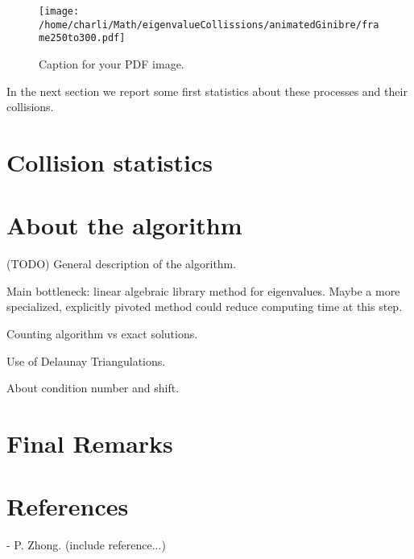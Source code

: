 \documentclass{article}
\begin{document}
\newpage


\begin{figure}[htbp]
    \centering
    \texttt{[image: /home/charli/Math/eigenvalueCollissions/animatedGinibre/frame250to300.pdf]}
    \caption{Caption for your PDF image.}
    \label{fig:pdf_image}
\end{figure}

	In the next section we report some first statistics about these processes and their collisions.

	\section{Collision statistics}

	\section{About the algorithm}

	(TODO)
	General description of the algorithm. 
	
	Main bottleneck: linear algebraic library method for eigenvalues.
	Maybe a more specialized, explicitly pivoted method could 
	reduce computing time at this step.

	Counting algorithm vs exact solutions.

	Use of Delaunay Triangulations. 
	
	About condition number and shift.

	\section{Final Remarks}
	
	\section{References}

	- P. Zhong. (include reference...)
	
\end{document}
